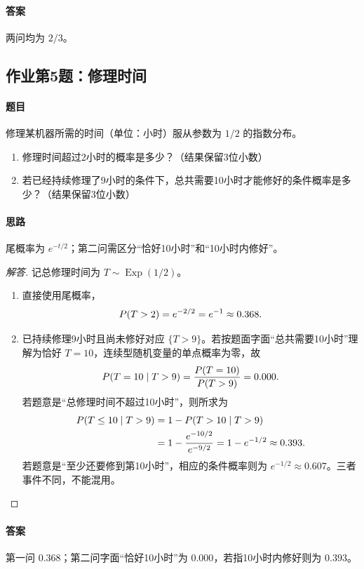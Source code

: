 \paragraph{答案} 两问均为 $2/3$。

\subsection{作业第5题：修理时间}\label{ex:w08-h5}
\paragraph{题目}
修理某机器所需的时间（单位：小时）服从参数为 $1/2$ 的指数分布。
\begin{enumerate}
\item 修理时间超过2小时的概率是多少？（结果保留3位小数）
\item 若已经持续修理了9小时的条件下，总共需要10小时才能修好的条件概率是多少？（结果保留3位小数）
\end{enumerate}
\paragraph{思路} 尾概率为 $e^{-t/2}$；第二问需区分“恰好10小时”和“10小时内修好”。
\begin{proof}[解答]
记总修理时间为 $T\sim\operatorname{Exp}(1/2)$。
\begin{enumerate}
\item 直接使用尾概率，
\[
\P(T>2)=e^{-2/2}=e^{-1}\approx0.368.
\]
\item 已持续修理9小时且尚未修好对应 $\{T>9\}$。若按题面字面“总共需要10小时”理解为恰好 $T=10$，连续型随机变量的单点概率为零，故
\[
\P(T=10\mid T>9)=\frac{\P(T=10)}{\P(T>9)}=0.000.
\]
若题意是“总修理时间不超过10小时”，则所求为
\begin{align*}
\P(T\leq10\mid T>9)
&=1-\P(T>10\mid T>9)\\
&=1-\frac{e^{-10/2}}{e^{-9/2}}
=1-e^{-1/2}\approx0.393.
\end{align*}
若题意是“至少还要修到第10小时”，相应的条件概率则为 $e^{-1/2}\approx0.607$。三者事件不同，不能混用。
\end{enumerate}
\end{proof}
\paragraph{答案} 第一问 $0.368$；第二问字面“恰好10小时”为 $0.000$，若指10小时内修好则为 $0.393$。

